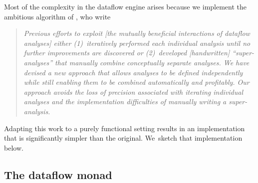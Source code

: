 \documentclass[blockstyle,preprint,nocopyrightspace]{sigplanconf}
\begin{document}
Most of the complexity in the dataflow engine arises because we
implement the ambitious algorithm of
\citet{lerner-grove-chambers:2002}, who write
\begin{quote}
\emph{Previous efforts to exploit [the mutually beneficial
interactions of dataflow analyses] either (1)~iteratively performed
each individual analysis until no further improvements are discovered
or (2)~developed [handwritten] ``super-analyses'' that manually
combine conceptually separate analyses. We have devised a new approach
that allows analyses to be defined independently while still enabling
them to be combined automatically and profitably. Our approach avoids
the loss of precision associated with iterating individual analyses
and the implementation difficulties of manually writing a
super-analysis.}
\end{quote}
Adapting this work to a purely functional setting results in an
implementation that is significantly simpler than the original.
We~sketch that implementation below.





\subsection{The dataflow monad}
\end{document}
